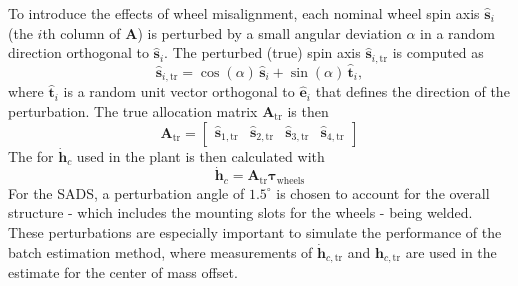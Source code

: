  To introduce the effects of wheel misalignment, each nominal wheel spin axis $\hat{\bm{s}}_i$ (the $i$th column of $\bm{A}$) is perturbed by a small angular deviation $\alpha$ in a random direction orthogonal to $\hat{\bm{s}}_i$. The perturbed (true) spin axis $\hat{\bm{s}}_{i,\text{tr}}$ is computed as
\begin{equation}\label{equation:wheel_perturb}
    \hat{\bm{s}}_{i,\text{tr}} = 
    \cos(\alpha)\,\hat{\bm{s}}_i 
    + \sin(\alpha)\,\hat{\bm{t}}_i,
\end{equation}
where $\hat{\bm{t}}_i$ is a random unit vector orthogonal to $\hat{\bm{e}}_i$ that defines the direction of the perturbation. The true allocation matrix $\bm{A}_\text{tr}$ is then
\begin{equation}
    \bm{A}_\text{tr}=\begin{bmatrix}
        \hat{\bm{s}}_{1,\text{tr}} & \hat{\bm{s}}_{2,\text{tr}} & \hat{\bm{s}}_{3,\text{tr}} & \hat{\bm{s}}_{4,\text{tr}}
    \end{bmatrix}
\end{equation}
The for $\dot{\bm{h}}_c$ used in the plant is then calculated with
\begin{equation}
    \dot{\bm{h}}_c = \bm{A}_\text{tr}\bm{\tau}_\text{wheels}
\end{equation}
For the SADS, a perturbation angle of $1.5^{\circ}$ is chosen to account for the overall structure - which includes the mounting slots for the wheels - being welded. These perturbations are especially important to simulate the performance of the batch estimation method, where measurements of $\dot{\bm{h}}_{c,\text{tr}}$ and $\bm{h}_{c,\text{tr}}$ are used in the estimate for the center of mass offset.  